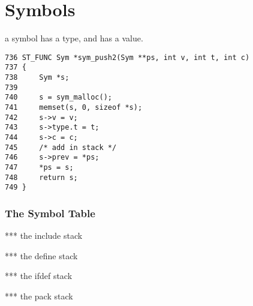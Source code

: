 
\chapter{Symbols}

a symbol has a type, and has a value.


\begin{verbatim}
736 ST_FUNC Sym *sym_push2(Sym **ps, int v, int t, int c)
737 {
738     Sym *s;
739 
740     s = sym_malloc();
741     memset(s, 0, sizeof *s);
742     s->v = v;
743     s->type.t = t;
744     s->c = c;
745     /* add in stack */
746     s->prev = *ps;
747     *ps = s;
748     return s;
749 }
\end{verbatim}

\subsection{The Symbol Table}



*** the include stack

*** the define stack

*** the ifdef stack

*** the pack stack


